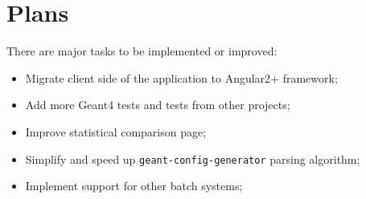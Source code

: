 \section{Plans}
\label{sec-plans}

There are major tasks to be implemented or improved:

\begin{itemize}
	\item Migrate client side of the application to Angular2+ framework;
	\item Add more Geant4 tests and tests from other projects;
	\item Improve statistical comparison page;
	\item Simplify and speed up {\tt geant-config-generator} parsing algorithm;
	\item Implement support for other batch systems;
\end{itemize}
